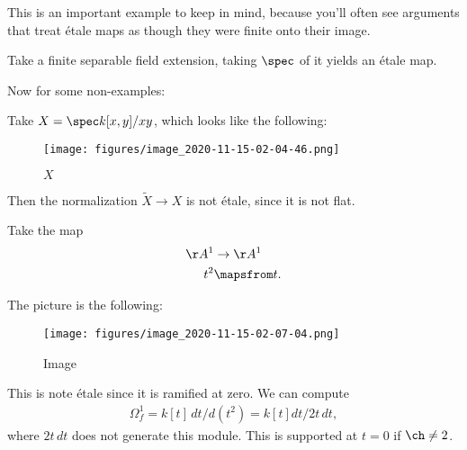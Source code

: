 \begin{warnings}

This is an important example to keep in mind, because you'll often see
arguments that treat étale maps as though they were finite onto their
image.

\end{warnings}

\begin{example}[?]

Take a finite separable field extension, taking \(\spec\) of it yields
an étale map.

\end{example}

Now for some non-examples:

\begin{example}

Take \(X = \spec k[x, y] / xy\), which looks like the following:

\begin{figure}
\centering
\texttt{[image: figures/image\_2020-11-15-02-04-46.png]}
\caption{\(X\)}
\end{figure}

Then the normalization \(\tilde X\to X\) is not étale, since it is not
flat.

\end{example}

\begin{example}

Take the map
\begin{align*}  
\AA^1 &\to \AA^1 \\
t^2 &\mapsfrom t
.\end{align*}

The picture is the following:

\begin{figure}
\centering
\texttt{[image: figures/image\_2020-11-15-02-07-04.png]}
\caption{Image}
\end{figure}

This is note étale since it is ramified at zero. We can compute
\begin{align*}  
\Omega_f^1 = k[t]\, dt / d(t^2) = k[t] dt/ 2t\, dt
,\end{align*} where \(2t\,dt\) does not generate this module. This is
supported at \(t=0\) if \(\ch \neq 2\).

\end{example}

